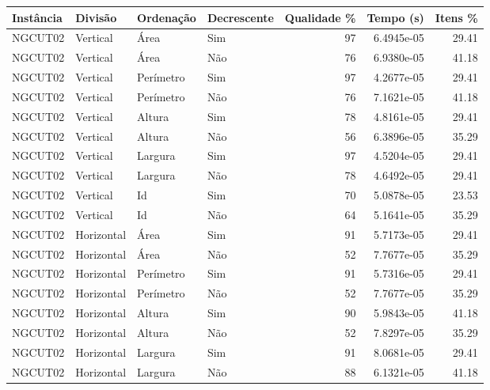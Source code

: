 \begin{tabular}{llllrrr}
    \hline
    Instância & Divisão     & Ordenação & Decrescente & Qualidade \% & Tempo (s)  & Itens \% \\
    \hline
    NGCUT02   & Vertical    & Área      & Sim         & 97           & 6.4945e-05 & 29.41    \\
    NGCUT02   & Vertical    & Área      & Não         & 76           & 6.9380e-05 & 41.18    \\
    NGCUT02   & Vertical    & Perímetro & Sim         & 97           & 4.2677e-05 & 29.41    \\
    NGCUT02   & Vertical    & Perímetro & Não         & 76           & 7.1621e-05 & 41.18    \\
    NGCUT02   & Vertical    & Altura    & Sim         & 78           & 4.8161e-05 & 29.41    \\
    NGCUT02   & Vertical    & Altura    & Não         & 56           & 6.3896e-05 & 35.29    \\
    NGCUT02   & Vertical    & Largura   & Sim         & 97           & 4.5204e-05 & 29.41    \\
    NGCUT02   & Vertical    & Largura   & Não         & 78           & 4.6492e-05 & 29.41    \\
    NGCUT02   & Vertical    & Id        & Sim         & 70           & 5.0878e-05 & 23.53    \\
    NGCUT02   & Vertical    & Id        & Não         & 64           & 5.1641e-05 & 35.29    \\
    NGCUT02   & Horizontal  & Área      & Sim         & 91           & 5.7173e-05 & 29.41    \\
    NGCUT02   & Horizontal  & Área      & Não         & 52           & 7.7677e-05 & 35.29    \\
    NGCUT02   & Horizontal  & Perímetro & Sim         & 91           & 5.7316e-05 & 29.41    \\
    NGCUT02   & Horizontal  & Perímetro & Não         & 52           & 7.7677e-05 & 35.29    \\
    NGCUT02   & Horizontal  & Altura    & Sim         & 90           & 5.9843e-05 & 41.18    \\
    NGCUT02   & Horizontal  & Altura    & Não         & 52           & 7.8297e-05 & 35.29    \\
    NGCUT02   & Horizontal  & Largura   & Sim         & 91           & 8.0681e-05 & 29.41    \\
    NGCUT02   & Horizontal  & Largura   & Não         & 88           & 6.1321e-05 & 41.18    \\

\end{tabular}
